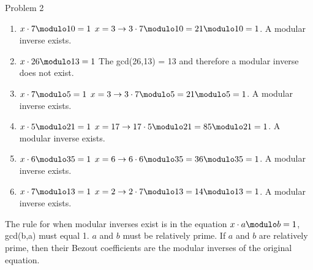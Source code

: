 \begin{problem}{Problem 2}
    \begin{Highlight}
        \begin{enumerate}[label = (\alph*), start = 2]
            \item $x \cdot 7 \modulo 10 = 1$ \hspace*{10pt} $x = 3 \rightarrow 3 \cdot 7 \modulo 10 = 21 \modulo 10 = 1$. A modular inverse exists.
            \item $x \cdot 26 \modulo 13 = 1$ \hspace*{10pt} The gcd(26,13) = 13 and therefore a modular inverse does not exist.
            \item $x \cdot 7 \modulo 5 = 1$ \hspace*{10pt} $x = 3 \rightarrow 3 \cdot 7 \modulo 5 = 21 \modulo 5 = 1$. A modular inverse exists.
            \item $x \cdot 5 \modulo 21 = 1$ \hspace*{10pt} $x = 17 \rightarrow 17 \cdot 5 \modulo 21 = 85 \modulo 21 = 1$. A modular inverse exists.
            \item $x \cdot 6 \modulo 35 = 1$ \hspace*{10pt} $x = 6 \rightarrow 6 \cdot 6 \modulo 35 = 36 \modulo 35 = 1$. A modular inverse exists.
            \item $x \cdot 7 \modulo 13 = 1$ \hspace*{10pt} $x = 2 \rightarrow 2 \cdot 7 \modulo 13 = 14 \modulo 13 = 1$. A modular inverse exists.
        \end{enumerate}
    \end{Highlight}

    \begin{Highlight}[Synopsis]
        The rule for when modular inverses exist is in the equation $x \cdot a \modulo b = 1$, gcd(b,a) must equal 1. $a$ and $b$ must be relatively prime.
        If $a$ and $b$ are relatively prime, then their Bezout coefficients are the modular inverses of the original equation.
    \end{Highlight}
\end{problem}

